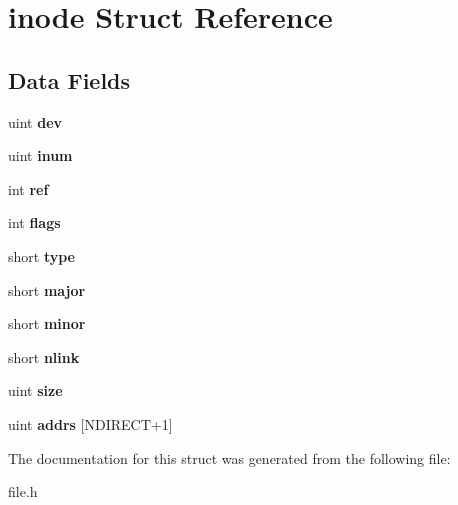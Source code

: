 \hypertarget{structinode}{}\section{inode Struct Reference}
\label{structinode}
\subsection*{Data Fields}
\begin{DoxyCompactItemize}
\item 
uint {\bfseries dev}\hypertarget{structinode_a121742a89c4531f03a7de1613d5be605}{}\label{structinode_a121742a89c4531f03a7de1613d5be605}

\item 
uint {\bfseries inum}\hypertarget{structinode_a8acc2b9df0bfc6856da62925763db7fe}{}\label{structinode_a8acc2b9df0bfc6856da62925763db7fe}

\item 
int {\bfseries ref}\hypertarget{structinode_a6a519028ee67f805482b3e1725bf09c5}{}\label{structinode_a6a519028ee67f805482b3e1725bf09c5}

\item 
int {\bfseries flags}\hypertarget{structinode_a47516965aad946199a3a4c95b884c3b3}{}\label{structinode_a47516965aad946199a3a4c95b884c3b3}

\item 
short {\bfseries type}\hypertarget{structinode_a8d74bec2898785c057111c328d23fda2}{}\label{structinode_a8d74bec2898785c057111c328d23fda2}

\item 
short {\bfseries major}\hypertarget{structinode_a34af7242018a977dace5730683850875}{}\label{structinode_a34af7242018a977dace5730683850875}

\item 
short {\bfseries minor}\hypertarget{structinode_a37878866e7905b666db2aa33076076a2}{}\label{structinode_a37878866e7905b666db2aa33076076a2}

\item 
short {\bfseries nlink}\hypertarget{structinode_af8b88b409bea7ef99c49a55f387538b2}{}\label{structinode_af8b88b409bea7ef99c49a55f387538b2}

\item 
uint {\bfseries size}\hypertarget{structinode_a918af769c48a8ca8afac057bf83d12de}{}\label{structinode_a918af769c48a8ca8afac057bf83d12de}

\item 
uint {\bfseries addrs} \mbox{[}N\+D\+I\+R\+E\+CT+1\mbox{]}\hypertarget{structinode_a7ba4ab7e52404b80d6d854678715ae30}{}\label{structinode_a7ba4ab7e52404b80d6d854678715ae30}

\end{DoxyCompactItemize}


The documentation for this struct was generated from the following file\+:\begin{DoxyCompactItemize}
\item 
file.\+h\end{DoxyCompactItemize}
